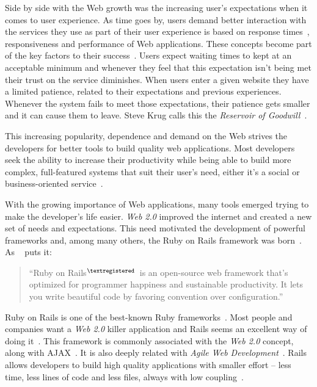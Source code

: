 Side by side with the Web growth was the increasing user's expectations when it comes to user experience. As time goes by, users demand better interaction with the services they use as part of their user experience is based on response times~\cite{prioritizing_web_usability}, responsiveness and performance of Web applications. These concepts become part of the key factors to their success~\cite{responsiveness}. Users expect waiting times to kept at an acceptable minimum and whenever they feel that this expectation isn't being met their trust on the service diminishes. When users enter a given website they have a limited patience, related to their expectations and previous experiences. Whenever the system fails to meet those expectations, their patience gets smaller and it can cause them to leave. Steve Krug calls this the \textit{Reservoir of Goodwill}~\cite{dont_make_me_think}.

This increasing popularity, dependence and demand on the Web strives the developers for better tools to build quality web applications. Most developers seek the ability to increase their productivity while being able to build more complex, full-featured systems that suit their user's need, either it's a social or business-oriented service~\cite{comparison_agile_frameworks}.

With the growing importance of Web applications, many tools emerged trying to make the developer's life easier. \textit{Web 2.0} improved the internet and created a new set of needs and expectations. This need motivated the development of powerful frameworks and, among many others, the Ruby on Rails framework was born~\cite{what_is_web20}. As ~\cite{rubyonrails} puts it:
\begin{quote}
  ``Ruby on Rails$^{\scriptsize \textregistered}$~is an open-source web framework that's optimized for programmer happiness and sustainable productivity. It lets you write beautiful code by favoring convention over configuration.''
\end{quote}
Ruby on Rails is one of the best-known Ruby frameworks~\cite{agile_webdevelopment_with_rails}. Most people and companies want a \textit{Web 2.0} killer application and Rails seems an excellent way of doing it~\cite{oo_business_models}. This framework is commonly associated with the \textit{Web 2.0} concept, along with AJAX~\cite{spaghetti_code}. It is also deeply related with \textit{Agile Web Development}~\cite{agile_webdevelopment_with_rails}. Rails allows developers to build high quality applications with smaller effort – less time, less lines of code and less files, always with low coupling~\cite{maintainability_web_applications_j2ee_dotnet_ror}.

